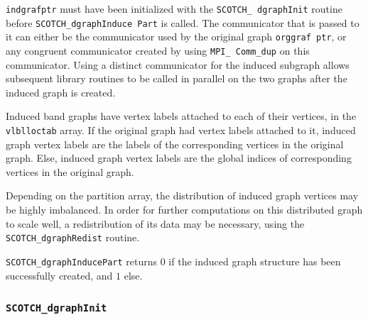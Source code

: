 \begin{itemize}
{\tt indgrafptr} must have been initialized with the {\tt SCOTCH\_\lbt
dgraph\lbt Init} routine before {\tt SCOTCH\_dgraph\lbt Induce\lbt
Part} is called. The communicator that is passed to it can either be
the communicator used by the original graph {\tt org\lbt graf\lbt
ptr}, or any congruent communicator created by using {\tt MPI\_\lbt
Comm\_\lbt dup} on this communicator. Using a distinct communicator
for the induced subgraph allows subsequent library routines to be
called in parallel on the two graphs after the induced graph is
created.

Induced band graphs have vertex labels attached to each of their
vertices, in the {\tt vlbl\lbt loc\lbt tab} array. If the original
graph had vertex labels attached to it, induced graph vertex labels
are the labels of the corresponding vertices in the original
graph. Else, induced graph vertex labels are the global indices of
corresponding vertices in the original graph.

Depending on the partition array, the distribution of induced graph
vertices may be highly imbalanced. In order for further computations
on this distributed graph to scale well, a redistribution of its data
may be necessary, using the {\tt SCOTCH\_dgraph\lbt Redist} routine.

\progret

{\tt SCOTCH\_dgraphInducePart} returns $0$ if the induced graph
structure has been successfully created, and $1$ else.
\end{itemize}

\subsubsection{{\tt SCOTCH\_dgraphInit}}
\label{sec-lib-func-dgraphinit}

